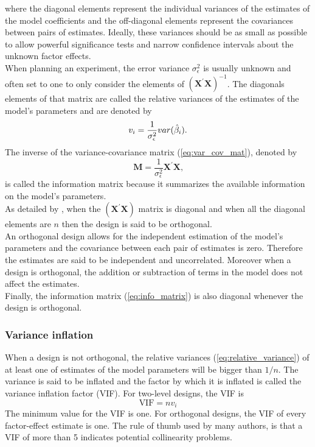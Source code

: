 where the diagonal elements represent the individual variances of the estimates of the model coefficients and the off-diagonal elements represent the covariances between pairs of estimates. Ideally, these variances should be as small as possible to allow powerful significance tests and narrow confidence intervals about the unknown factor effects.\\
When planning an experiment, the error variance $\sigma_{\epsilon}^2$  is usually unknown and often set to one to only consider the elements of $ (\mathbf{X}^{\prime} \mathbf{X})^{-1}$. The diagonals elements of that matrix are called the relative variances of the estimates of the model's parameters and are denoted by 
\begin{equation}
     v_i = \dfrac{1}{\sigma_{\epsilon}^2}var(\Hat{\beta}_i)
     \text{.}
     \label{eq:relative_variance}
\end{equation}
The inverse of the variance-covariance matrix (\ref{eq:var_cov_mat}), denoted by
\begin{equation}
    \mathbf{M} = \dfrac{1}{\sigma^2_{\epsilon}} \mathbf{X^{\prime} X}
    \text{,}
    \label{eq:info_matrix}
\end{equation}
is called the information matrix because it summarizes the available information on the model's parameters. \\
As detailed by \textcite{goos2011optimal}, when the $(\mathbf{X}^{\prime}\mathbf{X})$ matrix is diagonal and when all the diagonal elements are $n$ then the design is said to be orthogonal.\\
An orthogonal design allows for the independent estimation of the model's parameters and the covariance between each pair of estimates is zero. Therefore the estimates are said to be independent and uncorrelated. Moreover when a design is orthogonal, the addition or subtraction of terms in the model does not affect the estimates.\\
Finally, the information matrix (\ref{eq:info_matrix}) is also diagonal whenever the design is orthogonal.

\subsubsection{Variance inflation}
\label{sec:variance_inflation}
When a design is not orthogonal, the relative variances (\ref{eq:relative_variance}) of at least one of estimates of the model parameters will be bigger than $1/n$. The variance is said to be inflated and the factor by which it is inflated is called the variance inflation factor (VIF). For two-level designs, the VIF is 
\begin{equation}
    \text{VIF}= nv_i
\end{equation}
The minimum value for the VIF is one. For orthogonal designs, the VIF of every factor-effect estimate is one. The rule of thumb used by many authors, is that a VIF of more than 5 indicates potential collinearity problems.

